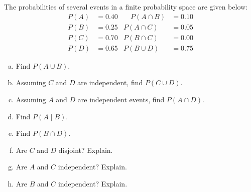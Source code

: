 \documentclass[11pt,letterpaper]{article}
\begin{document}

 The probabilities of several events in a finite probability space are given below:
	\[
	\begin{aligned}
	P(A)&= 0.40 &\quad P(A \cap B)&= 0.10 \\
	P(B)&= 0.25 & P(A \cap C)&= 0.05 \\
	P(C)&= 0.70 & P(B \cap C)&= 0.00 \\
	P(D)&= 0.65 & P(B \cup D)&= 0.75
	\end{aligned}
	\] 
\begin{enumerate}[(a)]
\item Find $P(A \cup B)$. 
\item Assuming $C$ and $D$ are independent, find $P(C \cup D)$. 
\item Assuming $A$ and $D$ are independent events, find $P(A \cap D)$.
\item Find $P(A \;|\; B)$.
\item Find $P(B \cap D)$. 
\item Are $C$ and $D$ disjoint? Explain.
\item Are $A$ and $C$ independent? Explain.
\item Are $B$ and $C$ independent? Explain.
\end{enumerate}



\newpage
\end{document}
